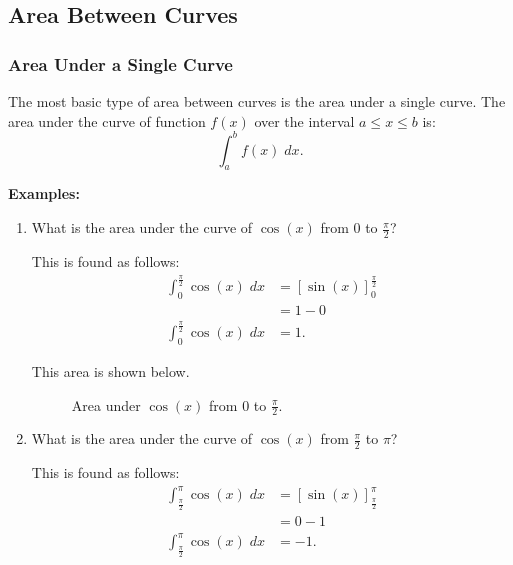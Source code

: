 \subsection{Area Between Curves}

\subsubsection{Area Under a Single Curve}
The most basic type of area between curves is the area under a single curve. The area under the curve of function $f(x)$ over the interval $a \leq x \leq b$ is:
\[ \int_a^b f(x) \; dx. \]

\noindent \textbf{Examples:}
\begin{enumerate}
    \item What is the area under the curve of $\cos(x)$ from $0$ to $\frac{\pi}{2}$?

    This is found as follows:
    \begin{align*}
        \int_0^{\frac{\pi}{2}} \cos(x) \; dx &= \left[ \sin(x) \right]_0^{\frac{\pi}{2}} \\[5pt]
        &= 1 - 0 \\
        \int_0^{\frac{\pi}{2}} \cos(x) \; dx &= 1.
    \end{align*}

    This area is shown below.
    \begin{figure}[H]
        \centering
        \caption{Area under $\cos(x)$ from $0$ to $\frac{\pi}{2}$.}
        \label{fig:area_cosx_pos}
    \end{figure}

    \item What is the area under the curve of $\cos(x)$ from $\frac{\pi}{2}$ to $\pi$?

    This is found as follows:
    \begin{align*}
        \int_{\frac{\pi}{2}}^\pi \cos(x) \; dx &= \left[ \sin(x) \right]_{\frac{\pi}{2}}^\pi \\[5pt]
        &= 0 - 1 \\
        \int_{\frac{\pi}{2}}^\pi \cos(x) \; dx &= -1.
    \end{align*}


\end{enumerate}
